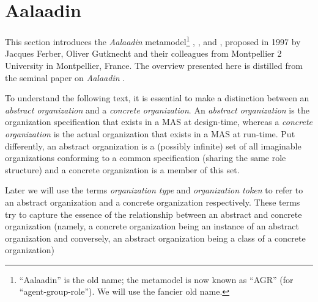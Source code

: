 
\section{Aalaadin}

This section introduces the \textit{Aalaadin} metamodel\footnote{``Aalaadin'' is the old name; the metamodel is now known as ``AGR'' (for ``agent-group-role''). We will use the fancier old name.} \cite{Ferber97}, \cite{Ferber98}, \cite{Ferber00} and \cite{Ferber03}, proposed in 1997 by Jacques Ferber, Oliver Gutknecht and their colleagues from Montpellier 2 University in Montpellier, France.
The overview presented here is distilled from the seminal paper on \textit{Aalaadin} \cite{Ferber97}.


To understand the following text, it is essential to make a distinction between an \textit{abstract organization} and a \textit{concrete organization}.
An \textit{abstract organization} is the organization specification that exists in a MAS at design-time, whereas a \textit{concrete organization} is the actual organization that exists in a MAS at run-time.
Put differently, an abstract organization is a (possibly infinite) set of all imaginable organizations conforming to a common specification (sharing the same role structure) and a concrete organization is a member of this set.

Later we will use the terms \textit{organization type} and \textit{organization token} to refer to an abstract organization and a concrete organization respectively.
These terms try to capture the essence of the relationship between an abstract and concrete organization (namely, a concrete organization being an instance of an abstract organization and conversely, an abstract organization being a class of a concrete organization)

